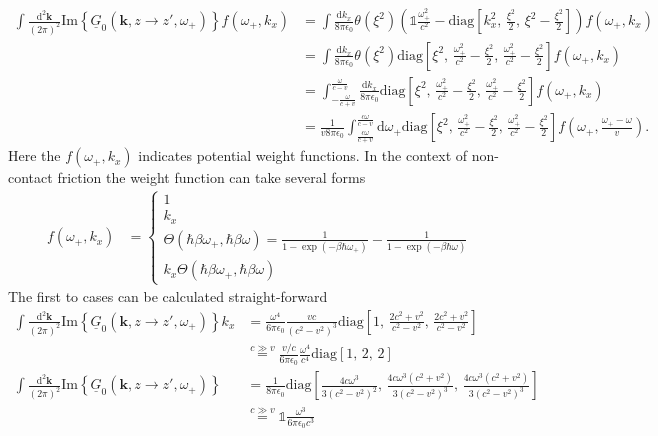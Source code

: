 \documentclass[11pt]{article}
\newcommand{\vv}[1]{\mathbf{#1}}
\newcommand{\dd}[0]{\mathrm{d}}
\begin{document}
\begin{align}
  \int\frac{\dd^2\vv k}{(2\pi)^2}  \mathrm{Im}\left\{\underline{G}_0(\vv k, z\to z',\omega_+)\right\}f(\omega_+,k_x) &=
  \int\frac{\dd k_x}{8\pi\epsilon_0}
  \theta(\xi^2)
  \left(
  \mathbb{1}\frac{\omega_+^2}{c^2} -
    \mathrm{diag}\left[
      k_x^2,\,\frac{\xi^2}{2},\,\xi^2-\frac{\xi^2}{2}
    \right]
  \right)f(\omega_+,k_x)
  \\
&=
  \int\frac{\dd k_x}{8\pi\epsilon_0}
  \theta(\xi^2)
    \mathrm{diag}\left[
      \xi^2,\,\frac{\omega_+^2}{c^2}-\frac{\xi^2}{2},\,\frac{\omega_+^2}{c^2}-\frac{\xi^2}{2}    \right]f(\omega_+,k_x)
  \\
&=
\int_{-\frac{\omega}{c+v}}^{\frac{\omega}{c-v}}\frac{\dd k_x}{8\pi\epsilon_0}
    \mathrm{diag}\left[
      \xi^2,\,\frac{\omega_+^2}{c^2}-\frac{\xi^2}{2},\,\frac{\omega_+^2}{c^2}-\frac{\xi^2}{2}    \right]f(\omega_+,k_x)
    \\
&=
\frac{1}{v8\pi\epsilon_0}
\int_{\frac{c\omega}{c+v}}^{\frac{c\omega}{c-v}}\dd \omega_+
    \mathrm{diag}\left[
    \xi^2,\,\frac{\omega_+^2}{c^2}-\frac{\xi^2}{2},\,\frac{\omega_+^2}{c^2}-\frac{\xi^2}{2}    \right]f(\omega_+,\frac{\omega_+-\omega}{v})
      .
\end{align}
Here the $f(\omega_+,k_x)$ indicates potential weight functions. In the context of non-contact friction the weight function can take several forms
\begin{align}
  f(\omega_+,k_x) &=
  \begin{cases}
  1
  \\
  k_x
  \\
  \Theta(\hbar\beta\omega_+,\hbar\beta\omega) = \frac{1}{1-\exp(-\beta\hbar\omega_+)}-\frac{1}{1-\exp(-\beta\hbar\omega)}
  \\
  k_x\Theta(\hbar\beta\omega_+,\hbar\beta\omega)
  \end{cases}
\end{align}
The first to cases can be calculated straight-forward
\begin{align}
  \int\frac{\dd^2\vv k}{(2\pi)^2}  \mathrm{Im}\left\{\underline{G}_0(\vv k, z\to z',\omega_+)\right\}k_x 
  &=
\frac{\omega^4}{6\pi\epsilon_0} 
 \frac{ v c }{(c^2-v^2)^3}   
\mathrm{diag}\left[
    1,\,
  \frac{  2 c^2+v^2}{ c^2-v^2}
  ,\,
  \frac{ 2 c^2+v^2}{ c^2-v^2}
\right]
\\
&\stackrel{c\gg v}=
\frac{v/c }{6\pi\epsilon_0} 
 \frac{ \omega^4 }{c^4}   
\mathrm{diag}\left[
    1,\,
    2
    ,\,
     2\right]
\\
  \int\frac{\dd^2\vv k}{(2\pi)^2}  \mathrm{Im}\left\{\underline{G}_0(\vv k, z\to z',\omega_+)\right\} 
  &=
  \frac{1}{8\pi\epsilon_0}\mathrm{diag}\left[
  \frac{4 c \omega ^3}{3 \left(c^2-v^2\right)^2}
    ,\,
    \frac{4 c \omega ^3 \left(c^2+v^2\right)}{3 \left(c^2-v^2\right)^3}
  ,\,
\frac{4 c \omega ^3 \left(c^2+v^2\right)}{3 \left(c^2-v^2\right)^3}  
\right]
  \\
  &\stackrel{c\gg v}=
  \mathbb{1}
\frac{\omega^3}{6\pi \epsilon_0 c^3}
\end{align}
\end{document}
